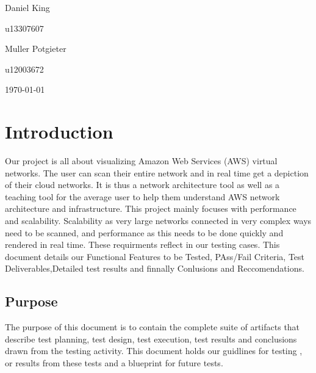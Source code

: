 \documentclass[hidelinks,a4paper,12pt]{article}
\begin{document}
\begin{titlepage}
\begin{center}
\begin{minipage}{0.4\textwidth}
\begin{flushleft} \large
Daniel {King}
\end{flushleft}
\end{minipage}
\begin{minipage}{0.4\textwidth}
\begin{flushright} \large
\emph{}
u13307607
\end{flushright}
\end{minipage}

\begin{minipage}{0.4\textwidth}
\begin{flushleft} \large
Muller {Potgieter}
\end{flushleft}
\end{minipage}
\begin{minipage}{0.4\textwidth}
\begin{flushright} \large
\emph{}
u12003672
\end{flushright}
\end{minipage}

\vfill
{\large \today}
\end{center}
\end{titlepage}
\footnotesize
%
\normalsize


\tableofcontents
\newpage
{}

\newpage
\section{Introduction} 
Our project is all about visualizing Amazon Web Services (AWS) virtual networks. The user can scan their entire network and in real time get a depiction of their cloud networks. It is thus a network architecture tool as well as a teaching tool for the average user to help them understand AWS network architecture and infrastructure. This project mainly focuses with performance and scalability. Scalability as very large networks connected in very complex ways need to be scanned, and performance as this needs to be done quickly and rendered in real time. These requirments reflect in our testing cases. This document details our Functional Features to be Tested, PAss/Fail Criteria, Test Deliverables,Detailed test results and finnally Conlusions and Reccomendations.

\subsection{Purpose}
The purpose of this document is to contain the complete suite of artifacts that describe test planning, test design, test execution, test results and conclusions drawn from the testing activity. This document holds our guidlines for testing , or results from these tests and a blueprint for future tests.
\end{document}

